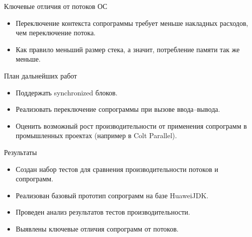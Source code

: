 \begin{frame}{Ключевые отличия от потоков ОС}
	\begin{itemize}
		\item Переключение контекста сопрограммы требует меньше накладных расходов, чем переключение потока.
		\item Как правило меньший размер стека, а значит, потребление памяти так же меньше.
	\end{itemize}
\end{frame}

\begin{frame}{План дальнейших работ} 
	\begin{itemize}
		\item Поддержать synchronized блоков.
		\item Реализовать переключение сопрограммы при вызове ввода--вывода.
		\item Оценить возможный рост производительности от применения сопрограмм в промышленных
		проектах (например в Colt Parallel).
	\end{itemize}
\end{frame}

\begin{frame}{Результаты}
	\begin{itemize}
		\item Создан набор тестов для сравнения производительности потоков и сопрограмм.
		\item Реализован базовый прототип сопрограмм на базе HuaweiJDK.
		\item Проведен анализ результатов тестов производительности.
		\item Выявлены ключевые отличия сопрограмм от потоков.
	\end{itemize}
\end{frame}

